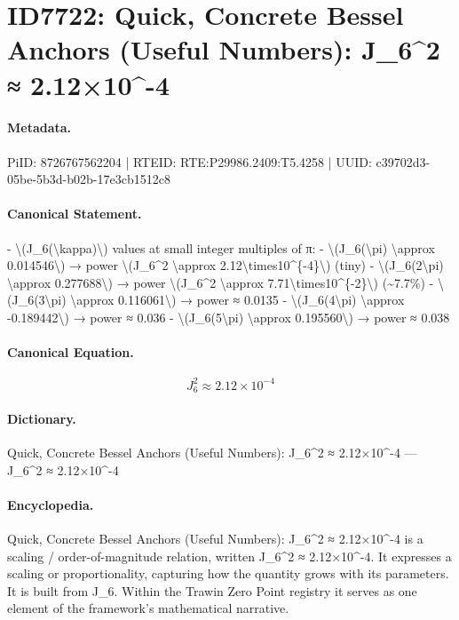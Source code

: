 \section*{ID7722: Quick, Concrete Bessel Anchors (Useful Numbers): J\_6\textasciicircum{}2 ≈ 2.12×10\textasciicircum{}-4}
\paragraph{Metadata.}
PiID: 8726767562204 | RTEID: RTE:P29986.2409:T5.4258 | UUID: c39702d3-05be-5b3d-b02b-17e3cb1512c8

\paragraph{Canonical Statement.}
- \textbackslash{}(J\_6(\textbackslash{}kappa)\textbackslash{}) values at small integer multiples of π: - \textbackslash{}(J\_6(\textbackslash{}pi) \textbackslash{}approx 0.014546\textbackslash{}) → power \textbackslash{}(J\_6\textasciicircum{}2 \textbackslash{}approx 2.12\textbackslash{}times10\textasciicircum{}\{-4\}\textbackslash{}) (tiny) - \textbackslash{}(J\_6(2\textbackslash{}pi) \textbackslash{}approx 0.277688\textbackslash{}) → power \textbackslash{}(J\_6\textasciicircum{}2 \textbackslash{}approx 7.71\textbackslash{}times10\textasciicircum{}\{-2\}\textbackslash{}) (\textasciitilde{}7.7\%) - \textbackslash{}(J\_6(3\textbackslash{}pi) \textbackslash{}approx 0.116061\textbackslash{}) → power ≈ 0.0135 - \textbackslash{}(J\_6(4\textbackslash{}pi) \textbackslash{}approx -0.189442\textbackslash{}) → power ≈ 0.036 - \textbackslash{}(J\_6(5\textbackslash{}pi) \textbackslash{}approx 0.195560\textbackslash{}) → power ≈ 0.038

\paragraph{Canonical Equation.}
\[
J_6^2 \approx 2.12\times10^{-4}
\]

\paragraph{Dictionary.}
Quick, Concrete Bessel Anchors (Useful Numbers): J\_6\textasciicircum{}2 ≈ 2.12×10\textasciicircum{}-4 — J\_6\textasciicircum{}2 ≈ 2.12×10\textasciicircum{}-4

\paragraph{Encyclopedia.}
Quick, Concrete Bessel Anchors (Useful Numbers): J\_6\textasciicircum{}2 ≈ 2.12×10\textasciicircum{}-4 is a scaling / order-of-magnitude relation, written J\_6\textasciicircum{}2 ≈ 2.12×10\textasciicircum{}-4. It expresses a scaling or proportionality, capturing how the quantity grows with its parameters. It is built from J\_6. Within the Trawin Zero Point registry it serves as one element of the framework's mathematical narrative.
